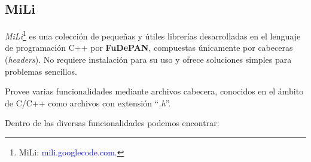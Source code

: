 \documentclass[12pt,a4paper,spanish]{article}
\begin{document}
	\subsection{MiLi}
		\par \textit{MiLi}\footnote{MiLi: \textcolor{blue}{mili.googlecode.com.}} es una colección de pequeñas y útiles 		librerías desarrolladas en el lenguaje de programación \textsc{C++} por \textbf{FuDePAN}, compuestas únicamente 		por cabeceras (\textit{headers}). No requiere instalación para su uso y ofrece soluciones simples para 		problemas sencillos.
		\par Provee varias funcionalidades mediante archivos cabecera, conocidos en el ámbito de C/C++ como archivos con 			extensión ``\textit{.h}''. 
		\par Dentro de las diversas funcionalidades podemos encontrar:
\end{document}
